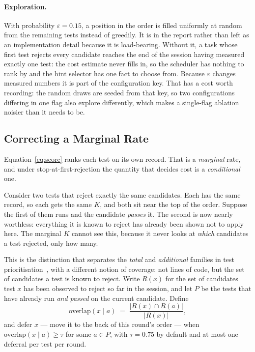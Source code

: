 \paragraph{Exploration.} With probability $\varepsilon = 0.15$, a position in
the order is filled uniformly at random from the remaining tests instead of
greedily. It is in the report rather than left as an implementation detail
because it is load-bearing. Without it, a task whose first test rejects every
candidate reaches the end of the session having measured exactly one test: the
cost estimate never fills in, so the scheduler has nothing to rank by and the
hint selector has one fact to choose from. Because $\varepsilon$ changes measured numbers it is part of the
configuration key. That has a cost worth recording: the random draws are
seeded from that key, so two configurations differing in one flag also explore
differently, which makes a single-flag ablation noisier than it needs to be.

\subsection{Correcting a Marginal Rate}
\label{sec:overlap}

Equation~\eqref{eq:score} ranks each test on its own record. That is a
\emph{marginal} rate, and under stop-at-first-rejection the quantity that
decides cost is a \emph{conditional} one.

Consider two tests that reject exactly the same candidates. Each has the same
record, so each gets the same $K$, and both sit near the top of the order.
Suppose the first of them runs and the candidate \emph{passes} it. The second
is now nearly worthless: everything it is known to reject has already been
shown not to apply here. The marginal $K$ cannot see this, because it never
looks at \emph{which} candidates a test rejected, only how many.

This is the distinction that separates the \emph{total} and \emph{additional}
families in test prioritisation~\citep{rothermel2001prioritizing}, with a
different notion of coverage: not lines of code, but the set of candidates a
test is known to reject. Write $R(x)$ for the set of candidates test $x$ has
been observed to reject so far in the session, and let $P$ be the tests that
have already run \emph{and passed} on the current candidate. Define
\begin{equation}
\mathrm{overlap}(x \mid a) \;=\; \frac{\lvert R(x) \cap R(a)\rvert}{\lvert R(x)\rvert},
\label{eq:overlap}
\end{equation}
and defer $x$ --- move it to the back of this round's order --- when
$\mathrm{overlap}(x \mid a) \ge \tau$ for some $a \in P$, with $\tau = 0.75$
by default and at most one deferral per test per round.

